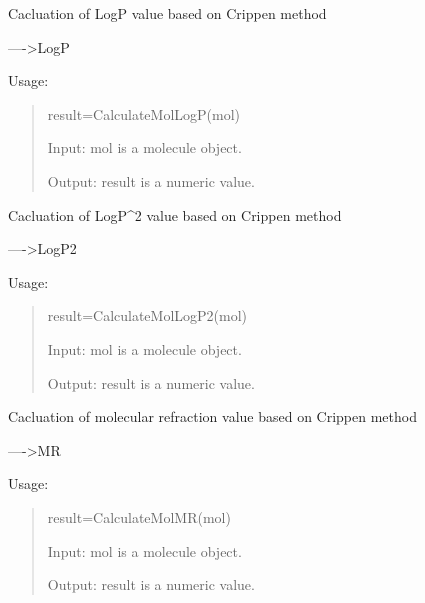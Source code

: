 \documentclass[letterpaper,10pt,english]{sphinxmanual}
\begin{document}

\begin{fulllineitems}
\label{reference/molproperty:molproperty.CalculateMolLogP}
Cacluation of LogP value based on Crippen method

----\textgreater{}LogP

Usage:
\begin{quote}

result=CalculateMolLogP(mol)

Input: mol is a molecule object.

Output: result is a numeric value.
\end{quote}

\end{fulllineitems}


\begin{fulllineitems}
\label{reference/molproperty:molproperty.CalculateMolLogP2}
Cacluation of LogP\textasciicircum{}2 value based on Crippen method

----\textgreater{}LogP2

Usage:
\begin{quote}

result=CalculateMolLogP2(mol)

Input: mol is a molecule object.

Output: result is a numeric value.
\end{quote}

\end{fulllineitems}


\begin{fulllineitems}
\label{reference/molproperty:molproperty.CalculateMolMR}
Cacluation of molecular refraction value based on Crippen method

----\textgreater{}MR

Usage:
\begin{quote}

result=CalculateMolMR(mol)

Input: mol is a molecule object.

Output: result is a numeric value.
\end{quote}

\end{fulllineitems}
\end{document}
